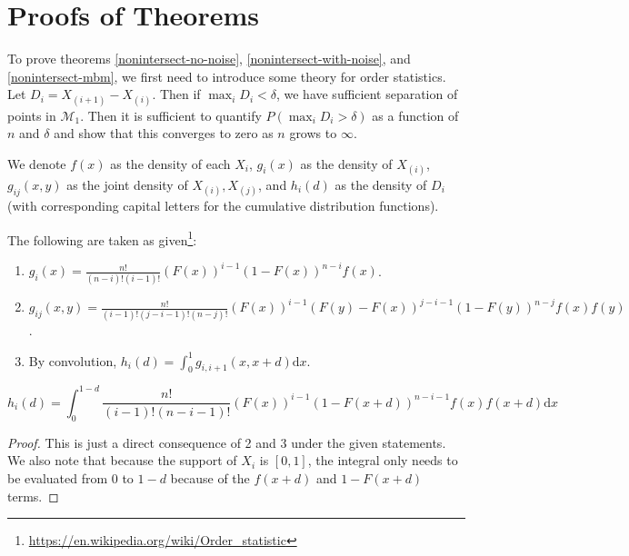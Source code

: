 \documentclass[12pt]{article}
\providecommand{\tightlist}{%
  \setlength{\itemsep}{0pt}\setlength{\parskip}{0pt}}
\begin{document}
\appendix

\section{Proofs of Theorems}

To prove theorems \ref{nonintersect-no-noise},
\ref{nonintersect-with-noise}, and \ref{nonintersect-mbm}, we first need
to introduce some theory for order statistics. Let
\(D_i = X_{(i+1)} - X_{(i)}\). Then if \(\max_i D_i < \delta\), we have
sufficient separation of points in \(\mathcal{M}_1\). Then it is
sufficient to quantify \(P(\max_i D_i > \delta)\) as a function of \(n\)
and \(\delta\) and show that this converges to zero as \(n\) grows to
\(\infty\).

We denote \(f(x)\) as the density of each \(X_i\), \(g_i(x)\) as the
density of \(X_{(i)}\), \(g_{ij}(x, y)\) as the joint density of
\(X_{(i)}, X_{(j)}\), and \(h_i(d)\) as the density of \(D_i\) (with
corresponding capital letters for the cumulative distribution
functions).

The following are taken as given\footnote{\url{https://en.wikipedia.org/wiki/Order_statistic}}:

\begin{enumerate}
\def\labelenumi{\arabic{enumi}.}
\tightlist
\item
  \(g_i(x) = \frac{n!}{(n-i)! (i-1)!} (F(x))^{i-1} (1 - F(x))^{n-i} f(x)\).
\item
  \(g_{ij}(x, y) = \frac{n!}{(i-1)! (j-i-1)! (n-j)!} (F(x))^{i-1} (F(y) - F(x))^{j-i-1} (1 - F(y))^{n-j} f(x) f(y)\).
\item
  By convolution,
  \(h_i(d) = \int_0^{1} g_{i, i+1} (x, x + d) \mathrm{d}x\).
\end{enumerate}

\begin{lemma}
\begin{equation}
\label{eq:pdf}
h_i(d) = \int_0^{1-d} \frac{n!}{(i-1)! (n-i-1)!} (F(x))^{i-1} (1 - F(x+d))^{n-i-1} f(x) f(x+d) \mathrm{d}x 
\end{equation}
\end{lemma}

\begin{proof}
This is just a direct consequence of 2 and 3 under the given statements. 
We also note that because the support of $X_i$ is $[0, 1]$, 
the integral only needs to be evaluated from $0$ to $1 - d$ 
because of the $f(x+d)$ and $1 - F(x+d)$ terms.
\end{proof}
\end{document}

